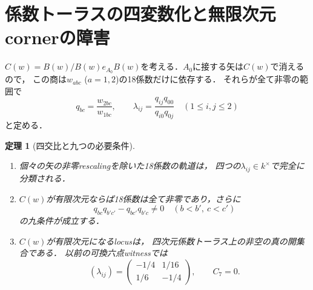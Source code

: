 \documentclass[11pt,a4paper]{ltjsarticle}
\newtheorem{theorem}{定理}[section]
\theoremstyle{definition}\newtheorem{remark}[theorem]{注意}
\begin{document}
\section{係数トーラスの四変数化と無限次元cornerの障害}
\label{sec:torus}
$C(w)=B(w)/B(w)e_{A_0}B(w)$を考える．$A_0$に接する矢は$C(w)$で消えるので，
この商は$w_{abc}$ ($a=1,2$)の18係数だけに依存する．
それらが全て非零の範囲で
\[
q_{bc}=\frac{w_{2bc}}{w_{1bc}},\qquad
\lambda_{ij}=\frac{q_{ij}q_{00}}{q_{i0}q_{0j}}
\quad(1\le i,j\le2)
\]
と定める．
\begin{theorem}[四交比と九つの必要条件]\label{thm:torus}
\begin{enumerate}
\item 個々の矢の非零rescalingを除いた18係数の軌道は，
四つの$\lambda_{ij}\in k^\times$で完全に分類される．
\item $C(w)$が有限次元ならば18係数は全て非零であり，さらに
\begin{equation}\label{eq:minor}
q_{bc}q_{b'c'}-q_{bc'}q_{b'c}\ne0
\quad(b<b',\ c<c')
\end{equation}
の九条件が成立する．
\item $C(w)$が有限次元になるlocusは，
四次元係数トーラス上の非空の真の開集合である．
以前の可換六点witnessでは
\[
(\lambda_{ij})=
\begin{pmatrix}-1/4&1/16\\1/6&-1/4\end{pmatrix},\qquad C_7=0.
\]
\end{enumerate}
\end{theorem}
\end{document}
